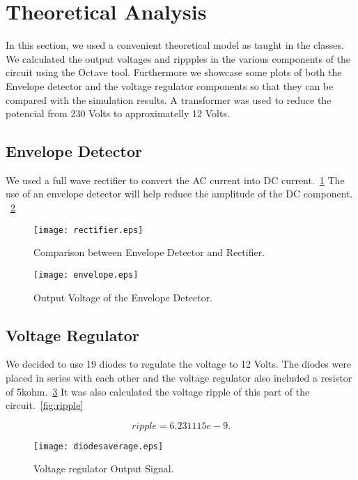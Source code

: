 \section{Theoretical Analysis}
\label{sec:analysis}

In this section, we used a convenient theoretical model as taught in the classes. We calculated the output voltages and rippples in the various components of the circuit using the Octave tool. Furthermore we showcase some plots of both the Envelope detector and the voltage regulator components so that they can be compared with the simulation results.
A transformer was used to reduce the potencial from 230 Volts to approximatelly 12 Volts.

\subsection{Envelope Detector}

We used a full wave rectifier to convert the AC current into DC current.~\ref{fig:rectifier} The use of an envelope detector will help reduce the amplitude of the DC component. ~\ref{fig:envelope}  


\begin{figure}[h] \centering
\texttt{[image: rectifier.eps]}
\caption{Comparison between Envelope Detector and Rectifier.}
\label{fig:rectifier}
\end{figure}

\begin{figure}[h] \centering
\texttt{[image: envelope.eps]}
\caption{Output Voltage of the Envelope Detector.}
\label{fig:envelope}
\end{figure}

\subsection{Voltage Regulator}

We decided to use 19 diodes to regulate the voltage to 12 Volts. The diodes were placed in series with each other and the voltage regulator also included a resistor of 5kohm.~\ref{fig:regulator}
It was also calculated the voltage ripple of this part of the circuit.~\ref{fig:ripple}

\begin{equation}
  ripple = 6.231115e-9.
  \label{ripple}
\end{equation}

\begin{figure}[h] \centering
\texttt{[image: diodesaverage.eps]}
\caption{Voltage regulator Output Signal.}
\label{fig:regulator}
\end{figure}

